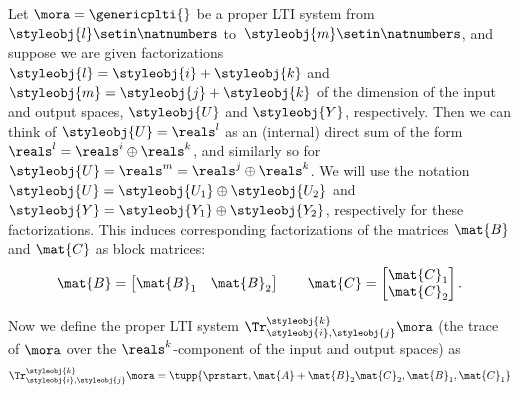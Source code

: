 \begin{definition}\label{def:trace-lti-prop}
    Let $\mora = \genericplti{}$ be a proper LTI system from $\styleobj{l}\setin \natnumbers$ to~$\styleobj{m}\setin \natnumbers$, and suppose we are given factorizations $\styleobj{l} = \styleobj{i} + \styleobj{k}$ and $\styleobj{m} = \styleobj{j} + \styleobj{k}$ of the dimension of the input and output spaces, $\styleobj{U}$ and $\styleobj{Y}$, respectively.
    Then we can think of $\styleobj{U} = \reals^l$ as an (internal) direct sum of the form $\reals^l = \reals^i \oplus \reals^k$, and similarly so for $\styleobj{U} = \reals^m = \reals^j \oplus \reals^k$.
    We will use the notation $\styleobj{U} = \styleobj{U_1} \oplus \styleobj{U_2}$ and $\styleobj{Y} = \styleobj{Y_1} \oplus \styleobj{Y_2}$, respectively for these factorizations.
    This induces corresponding factorizations of the matrices $\mat{B}$ and $\mat{C}$ as block matrices:
    \begin{equation}
        \mat{B} =
        \begin{bmatrix}
            \mat{B}_1 & \mat{B}_2
        \end{bmatrix}
        \qquad
        \mat{C} =
        \begin{bmatrix}
            \mat{C}_1 \\
            \mat{C}_2
        \end{bmatrix}.
    \end{equation}

    Now we define the proper LTI system $\Tr_{\styleobj{i},\styleobj{j}}^{\styleobj{k}}\mora$ (the trace of $\mora$ over the $\reals^k$-component of the input and output spaces) as
    \begin{equation}\label{eq:proper-LTI-trace-formula}
        \Tr_{\styleobj{i},\styleobj{j}}^{\styleobj{k}}\mora = \tupp{\prstart,\mat{A} + \mat{B}_2 \mat{C}_2, \mat{B}_1,\mat{C}_1}
    \end{equation}
\end{definition}

